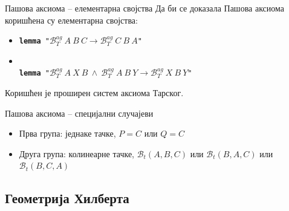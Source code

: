 \documentclass[slidestop, compress, mathserif, containsverbatim, xcolor=dvipsnames]{beamer}
\newcommand{\agbett}[3]{\ensuremath{\mathcal{B}_T^{\mathit{ag}}\ #1\ #2\ #3}}
\newcommand{\bett}[3]{\ensuremath{\mathcal{B}_t(#1, #2, #3)}}
\begin{document}
\begin{frame}{Пашова аксиома -- елементарна својства}
  Да би се доказала Пашова аксиома коришћена су елементарна својства:
  \begin{itemize}
  \item {} {\tt {\bf lemma} "$\agbett{A}{B}{C} \longrightarrow \agbett{C}{B}{A}$"\ }
  \item {} \\{\tt {\bf lemma} "$\agbett{A}{X}{B}\ \wedge\ \agbett{A}{B}{Y} \longrightarrow \agbett{X}{B}{Y}$"\ }
  \end{itemize}
  \begin{block}{}
    Коришћен је проширен систем аксиома Тарског.
  \end{block}
\end{frame}


\begin{frame}{Пашова аксиома -- специјални случајеви}
  \begin{itemize}
  \item Прва група: једнаке тачке, $P = C$ или $Q = C$
    \begin{center}
      
    \end{center}
  \item Друга група: колинеарне тачке, $\bett{A}{B}{C}$ или $\bett{B}{A}{C}$ или $\bett{B}{C}{A}$
    \begin{center}
      
    \end{center}
  \end{itemize}
\end{frame}

\subsection*{Геометрија Хилберта}
\end{document}
